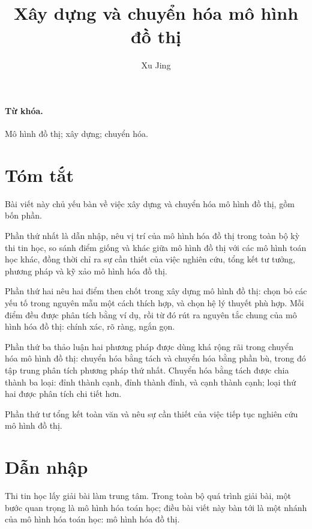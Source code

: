 \documentclass[11pt]{article}
\title{Xây dựng và chuyển hóa mô hình đồ thị}
\author{Xu Jing}
\date{}
\begin{document}
\maketitle


\renewcommand{\contentsname}{Mục lục}
\tableofcontents

\paragraph{Từ khóa.}
Mô hình đồ thị; xây dựng; chuyển hóa.

\section*{Tóm tắt}

Bài viết này chủ yếu bàn về việc xây dựng và chuyển hóa mô hình đồ thị, gồm
bốn phần.

Phần thứ nhất là dẫn nhập, nêu vị trí của mô hình hóa đồ thị trong toàn bộ
kỳ thi tin học, so sánh điểm giống và khác giữa mô hình đồ thị với các mô
hình toán học khác, đồng thời chỉ ra sự cần thiết của việc nghiên cứu, tổng
kết tư tưởng, phương pháp và kỹ xảo mô hình hóa đồ thị.

Phần thứ hai nêu hai điểm then chốt trong xây dựng mô hình đồ thị: chọn bỏ
các yếu tố trong nguyên mẫu một cách thích hợp, và chọn hệ lý thuyết phù
hợp. Mỗi điểm đều được phân tích bằng ví dụ, rồi từ đó rút ra nguyên tắc
chung của mô hình hóa đồ thị: chính xác, rõ ràng, ngắn gọn.

Phần thứ ba thảo luận hai phương pháp được dùng khá rộng rãi trong chuyển hóa
mô hình đồ thị: chuyển hóa bằng tách và chuyển hóa bằng phần bù, trong đó tập
trung phân tích phương pháp thứ nhất. Chuyển hóa bằng tách được chia thành ba
loại: đỉnh thành cạnh, đỉnh thành đỉnh, và cạnh thành cạnh; loại thứ hai được
phân tích chi tiết hơn.

Phần thứ tư tổng kết toàn văn và nêu sự cần thiết của việc tiếp tục nghiên
cứu mô hình đồ thị.

\section{Dẫn nhập}

Thi tin học lấy giải bài làm trung tâm. Trong toàn bộ quá trình giải bài, một
bước quan trọng là mô hình hóa toán học; điều bài viết này bàn tới là một
nhánh của mô hình hóa toán học: mô hình hóa đồ thị.
\end{document}

